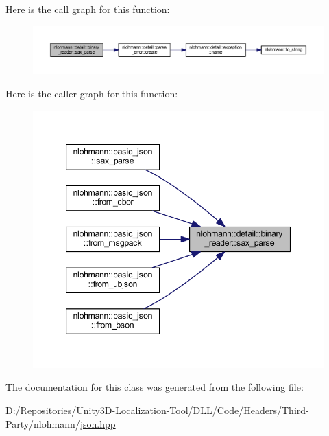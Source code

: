 Here is the call graph for this function\+:
\nopagebreak
\begin{figure}[H]
\begin{center}
\leavevmode
\includegraphics[width=350pt]{classnlohmann_1_1detail_1_1binary__reader_ab94a54d6e595c2620b07589cf4116256_cgraph}
\end{center}
\end{figure}
Here is the caller graph for this function\+:
\nopagebreak
\begin{figure}[H]
\begin{center}
\leavevmode
\includegraphics[width=347pt]{classnlohmann_1_1detail_1_1binary__reader_ab94a54d6e595c2620b07589cf4116256_icgraph}
\end{center}
\end{figure}


The documentation for this class was generated from the following file\+:\begin{DoxyCompactItemize}
\item 
D\+:/\+Repositories/\+Unity3\+D-\/\+Localization-\/\+Tool/\+D\+L\+L/\+Code/\+Headers/\+Third-\/\+Party/nlohmann/\mbox{\hyperlink{json_8hpp}{json.\+hpp}}\end{DoxyCompactItemize}
